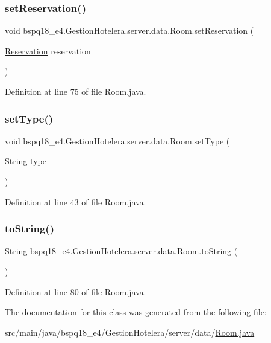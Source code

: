 \subsubsection{\texorpdfstring{set\+Reservation()}{setReservation()}}
{\footnotesize\ttfamily void bspq18\+\_\+e4.\+Gestion\+Hotelera.\+server.\+data.\+Room.\+set\+Reservation (\begin{DoxyParamCaption}\item[{\mbox{\hyperlink{classbspq18__e4_1_1_gestion_hotelera_1_1server_1_1data_1_1_reservation}{Reservation}}}]{reservation }\end{DoxyParamCaption})}



Definition at line 75 of file Room.\+java.

\mbox{\label{classbspq18__e4_1_1_gestion_hotelera_1_1server_1_1data_1_1_room_ae5c00383127f5e36610d77f97aebf8b0}} 
\subsubsection{\texorpdfstring{set\+Type()}{setType()}}
{\footnotesize\ttfamily void bspq18\+\_\+e4.\+Gestion\+Hotelera.\+server.\+data.\+Room.\+set\+Type (\begin{DoxyParamCaption}\item[{String}]{type }\end{DoxyParamCaption})}



Definition at line 43 of file Room.\+java.

\mbox{\label{classbspq18__e4_1_1_gestion_hotelera_1_1server_1_1data_1_1_room_a7e990a7117931a098256fee23b36c37b}} 
\subsubsection{\texorpdfstring{to\+String()}{toString()}}
{\footnotesize\ttfamily String bspq18\+\_\+e4.\+Gestion\+Hotelera.\+server.\+data.\+Room.\+to\+String (\begin{DoxyParamCaption}{ }\end{DoxyParamCaption})}



Definition at line 80 of file Room.\+java.



The documentation for this class was generated from the following file\+:\begin{DoxyCompactItemize}
\item 
src/main/java/bspq18\+\_\+e4/\+Gestion\+Hotelera/server/data/\mbox{\hyperlink{_room_8java}{Room.\+java}}\end{DoxyCompactItemize}
